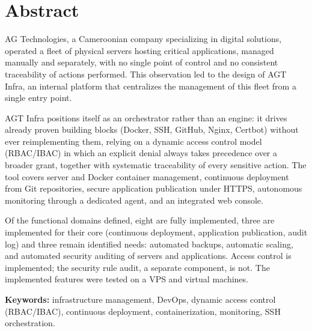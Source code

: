 \chapter*{Abstract}

AG Technologies, a Cameroonian company specializing in digital
solutions, operated a fleet of physical servers hosting critical
applications, managed manually and separately, with no single point of
control and no consistent traceability of actions performed. This
observation led to the design of AGT Infra, an internal platform that
centralizes the management of this fleet from a single entry point.

AGT Infra positions itself as an orchestrator rather than an engine: it
drives already proven building blocks (Docker, SSH, GitHub, Nginx,
Certbot) without ever reimplementing them, relying on a dynamic access
control model (RBAC/IBAC) in which an explicit denial always takes
precedence over a broader grant, together with systematic traceability
of every sensitive action. The tool covers server and Docker container
management, continuous deployment from Git repositories, secure
application publication under HTTPS, autonomous monitoring through a
dedicated agent, and an integrated web console.

Of the functional domains defined, eight are fully implemented,
three are implemented for their core (continuous deployment, application
publication, audit log) and three remain identified needs: automated
backups, automatic scaling, and automated security auditing of servers
and applications. Access control is implemented; the security rule
audit, a separate component, is not. The implemented features were
tested on a VPS and virtual machines.

\bigskip
\noindent\textbf{Keywords:} infrastructure management, DevOps, dynamic
access control (RBAC/IBAC), continuous deployment, containerization,
monitoring, SSH orchestration.